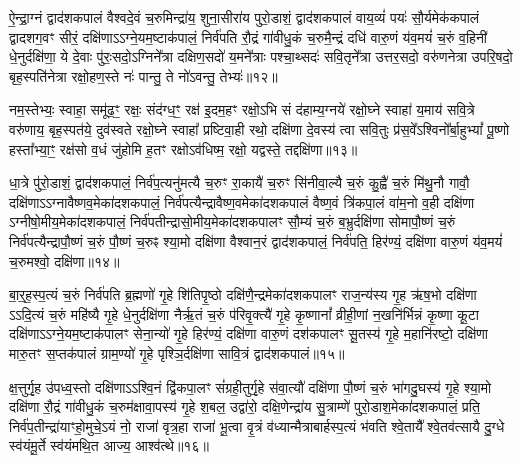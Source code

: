 {\anuvakamend[{सुभे॑षजमिहि॒ त्रीणि॑ च॥६॥}]}

ऐ॒न्द्रा॒ग्नं द्वाद॑शकपालं वैश्वदे॒वं च॒रुमिन्द्रा॑य॒ शुना॒सीरा॑य पुरो॒डाशं॒ द्वाद॑शकपालं वाय॒व्यं॑ पयः॑ सौ॒र्यमेक॑कपालं द्वादशग॒वꣳ सीरं॒ दक्षि॑णा\-ऽ\-ऽग्ने॒यम॒ष्टाक॑पालं॒ निर्व॑पति रौ॒द्रं गा॑वीधु॒कं च॒रुमै॒न्द्रं दधि॑ वारु॒णं य॑व॒मयं॑ च॒रुं व॒हिनी॑ धे॒नुर्दक्षि॑णा॒ ये दे॒वाः पु॑रः॒सदो॒\-ऽग्निने᳚त्रा दक्षिण॒सदो॑ य॒मने᳚त्राः पश्चा॒थ्सदः॑ सवि॒तृने᳚त्रा उत्तर॒सदो॒ वरु॑णनेत्रा उपरि॒षदो॒ बृह॒स्पति॑नेत्रा रक्षो॒हण॒स्ते नः॑ पान्तु॒ ते नो॑\-ऽवन्तु॒ तेभ्यः॑॥१२॥

नम॒स्तेभ्यः॒ स्वाहा॒ समू॑ढ॒ꣳ॒ रक्षः॒ संद॑ग्ध॒ꣳ॒ रक्ष॑ इ॒दम॒हꣳ रक्षो॒\-ऽभि सं द॑हाम्य॒ग्नये॑ रक्षो॒घ्ने स्वाहा॑ य॒माय॑ सवि॒त्रे वरु॑णाय॒ बृह॒स्पत॑ये॒ दुव॑स्वते रक्षो॒घ्ने स्वाहा᳚ प्रष्टिवा॒ही रथो॒ दक्षि॑णा दे॒वस्य॑ त्वा सवि॒तुः प्र॑स॒वे᳚\-ऽश्विनो᳚र्बा॒हु\-भ्यां᳚ पू॒ष्णो हस्ता᳚भ्या॒ꣳ॒ रक्ष॑सो व॒धं जु॑होमि ह॒तꣳ रक्षो\-ऽव॑धिष्म॒ रक्षो॒ यद्वस्ते॒ तद्दक्षि॑णा॥१३॥

{\anuvakamend[{तेभ्यः॒ पञ्च॑चत्वारिꣳशच्च॥७॥}]}

धा॒त्रे पु॑रो॒डाशं॒ द्वाद॑शकपालं॒ निर्व॑प॒त्यनु॑मत्यै च॒रुꣳ रा॒कायै॑ च॒रुꣳ सि॑नीवा॒ल्यै च॒रुं कु॒ह्वै॑ च॒रुं मि॑थु॒नौ गावौ॒ दक्षि॑णा\-ऽ\-ऽग्नावैष्णव॒मेका॑दशकपालं॒ निर्व॑पत्यैन्द्रावैष्ण॒वमेका॑दशकपालं वैष्ण॒वं त्रि॑कपा॒लं वा॑म॒नो व॒ही दक्षि॑णा \-ऽग्नीषो॒मीय॒मेका॑दशकपालं॒ निर्व॑पतीन्द्रासो॒मीय॒मेका॑दशकपालꣳ सौ॒म्यं च॒रुं ब॒भ्रुर्दक्षि॑णा सोमापौ॒ष्णं च॒रुं निर्व॑पत्यैन्द्रापौ॒ष्णं च॒रुं पौ॒ष्णं च॒रुꣴ श्या॒मो दक्षि॑णा वैश्वान॒रं द्वाद॑शकपालं॒ निर्व॑पति॒ हिर॑ण्यं॒ दक्षि॑णा वारु॒णं य॑व॒मयं॑ च॒रुमश्वो॒ दक्षि॑णा॥१४॥

{\anuvakamend[{निर॒ष्टौ च॥८॥}]}

बा॒र्॒\mbox{}ह॒स्प॒त्यं च॒रुं निर्व॑पति ब्र॒ह्मणो॑ गृ॒हे शि॑तिपृ॒ष्ठो दक्षि॑णै॒न्द्रमेका॑दशकपालꣳ राज॒न्य॑स्य गृ॒ह ऋ॑ष॒भो दक्षि॑णा \-ऽ\-ऽदि॒त्यं च॒रुं महि॑ष्यै गृ॒हे धे॒नुर्दक्षि॑णा नैर्\mbox{}ऋ॒तं च॒रुं प॑रिवृ॒क्त्यै॑ गृ॒हे कृ॒ष्णानां᳚ व्रीही॒णां न॒खनि॑र्भिन्नं कृ॒ष्णा कू॒टा दक्षि॑णा\-ऽ\-ऽग्ने॒यम॒ष्टाक॑पालꣳ सेना॒न्यो॑ गृ॒हे हिर॑ण्यं॒ दक्षि॑णा वारु॒णं दश॑कपालꣳ सू॒तस्य॑ गृ॒हे म॒हानि॑रष्टो॒ दक्षि॑णा मारु॒तꣳ स॒प्तक॑पालं ग्राम॒ण्यो॑ गृ॒हे पृश्ञि॒र्दक्षि॑णा सावि॒त्रं द्वाद॑शकपालं॥१५॥

क्ष॒त्तुर्गृ॒ह उ॑पध्व॒स्तो दक्षि॑णा\-ऽ\-ऽश्वि॒नं द्वि॑कपा॒लꣳ सं॑ग्रही॒तुर्गृ॒हे स॑वा॒त्यौ॑ दक्षि॑णा पौ॒ष्णं च॒रुं भा॑गदु॒घस्य॑ गृ॒हे श्या॒मो दक्षि॑णा रौ॒द्रं गा॑वीधु॒कं च॒रुम॑क्षावा॒पस्य॑ गृ॒हे श॒बल॒ उद्वा॑रो॒ दक्षि॒णेन्द्रा॑य सु॒त्राम्णे॑ पुरो॒डाश॒मेका॑दशकपालं॒ प्रति॒ निर्व॑प॒तीन्द्रा॑याꣳहो॒मुचे॒\-ऽयं नो॒ राजा॑ वृत्र॒हा राजा॑ भू॒त्वा वृ॒त्रं व॑ध्यान्मैत्राबार्\mbox{}हस्प॒त्यं भ॑वति श्वे॒तायै᳚ श्वे॒तव॑त्सायै दु॒ग्धे स्व॑यंमू॒र्ते स्व॑यंमथि॒त आज्य॒ आश्व॑त्थे॥१६॥

